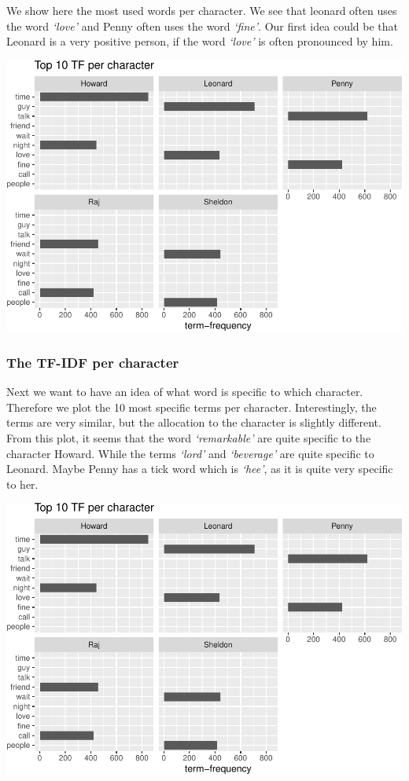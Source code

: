 \documentclass[
]{article}
\begin{document}
We show here the most used words per character. We see that leonard
often uses the word \emph{`love'} and Penny often uses the word
\emph{`fine'}. Our first idea could be that Leonard is a very positive
person, if the word \emph{`love'} is often pronounced by him.

\includegraphics{report_files/figure-latex/unnamed-chunk-26-1.pdf}

\hypertarget{the-tf-idf-per-character}{%
\subsubsection{The TF-IDF per
character}\label{the-tf-idf-per-character}}

Next we want to have an idea of what word is specific to which
character. Therefore we plot the 10 most specific terms per character.
Interestingly, the terms are very similar, but the allocation to the
character is slightly different. From this plot, it seems that the word
\emph{`remarkable'} are quite specific to the character Howard. While
the terms \emph{`lord'} and \emph{`beverage'} are quite specific to
Leonard. Maybe Penny has a tick word which is \emph{`hee'}, as it is
quite very specific to her.

\includegraphics{report_files/figure-latex/unnamed-chunk-27-1.pdf}
\end{document}
